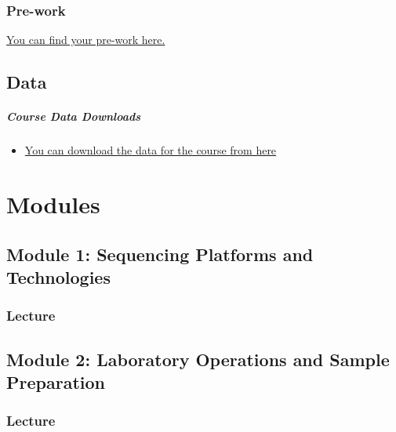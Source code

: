\documentclass[
]{book}
\providecommand{\tightlist}{%
  \setlength{\itemsep}{0pt}\setlength{\parskip}{0pt}}
\begin{document}
\section{Pre-work}\label{pre-work}

\href{https://docs.google.com/forms/d/e/1FAIpQLScewZhdlVSzXpY77kyWicauKDaEQy37RW4ZPZ9KNYWJyB03Mg/viewform}{You can find your pre-work here.}

\chapter{Data}\label{data}

\subsubsection{Course Data Downloads}\label{course-data-downloads}

\begin{itemize}
\tightlist
\item
  \href{https://drive.google.com/drive/folders/17o8Z1PQUGrf0I8mXe82L6sjNiqdjre2I}{You can download the data for the course from here}
\end{itemize}

\part{Modules}\label{part-modules}

\chapter{Module 1: Sequencing Platforms and Technologies}\label{module-1-sequencing-platforms-and-technologies}

\section{Lecture}\label{lecture}

\chapter{Module 2: Laboratory Operations and Sample Preparation}\label{module-2-laboratory-operations-and-sample-preparation}

\section{Lecture}\label{lecture-1}
\end{document}
